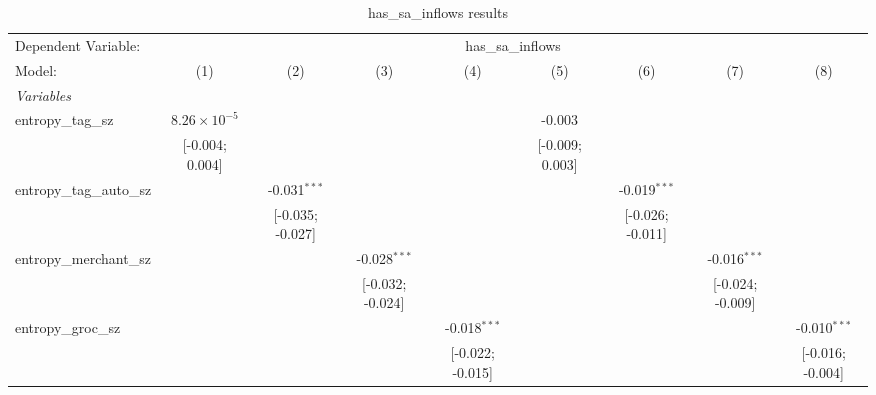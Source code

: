 
\begin{table}[htbp]
   \centering
   \tiny
   \begin{threeparttable}[b]
      \caption{has\_sa\_inflows results}
      \begin{tabular}{lcccccccc}
         \tabularnewline \midrule \midrule
         Dependent Variable: & \multicolumn{8}{c}{has\_sa\_inflows}\\
         Model:                    & (1)                            & (2)               & (3)                           & (4)              & (5)             & (6)              & (7)              & (8)\\  
         \midrule
         \emph{Variables}\\
         entropy\_tag\_sz          & $8.26\times 10^{-5}$           &                   &                               &                  & -0.003          &                  &                  &   \\   
                                   & [-0.004; 0.004]                &                   &                               &                  & [-0.009; 0.003] &                  &                  &   \\   
         entropy\_tag\_auto\_sz    &                                & -0.031$^{***}$    &                               &                  &                 & -0.019$^{***}$   &                  &   \\   
                                   &                                & [-0.035; -0.027]  &                               &                  &                 & [-0.026; -0.011] &                  &   \\   
         entropy\_merchant\_sz     &                                &                   & -0.028$^{***}$                &                  &                 &                  & -0.016$^{***}$   &   \\   
                                   &                                &                   & [-0.032; -0.024]              &                  &                 &                  & [-0.024; -0.009] &   \\   
         entropy\_groc\_sz         &                                &                   &                               & -0.018$^{***}$   &                 &                  &                  & -0.010$^{***}$\\   
                                   &                                &                   &                               & [-0.022; -0.015] &                 &                  &                  & [-0.016; -0.004]\\   

\end{tabular}
\end{threeparttable}
\end{table}
